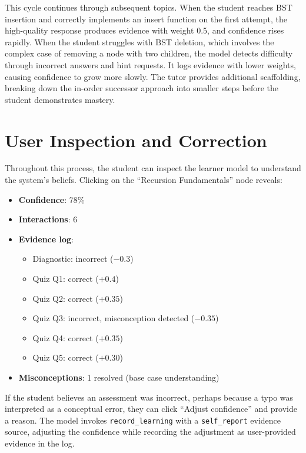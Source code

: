 \documentclass[logo,bsc,singlespacing,parskip,online]{infthesis}
\begin{document}
This cycle continues through subsequent topics. When the student reaches BST insertion and correctly implements an insert function on the first attempt, the high-quality response produces evidence with weight 0.5, and confidence rises rapidly. When the student struggles with BST deletion, which involves the complex case of removing a node with two children, the model detects difficulty through incorrect answers and hint requests. It logs evidence with lower weights, causing confidence to grow more slowly. The tutor provides additional scaffolding, breaking down the in-order successor approach into smaller steps before the student demonstrates mastery.

\section{User Inspection and Correction}

Throughout this process, the student can inspect the learner model to understand the system's beliefs. Clicking on the ``Recursion Fundamentals'' node reveals:

\begin{itemize}
\item \textbf{Confidence}: 78\%
\item \textbf{Interactions}: 6
\item \textbf{Evidence log}:
  \begin{itemize}
  \item Diagnostic: incorrect ($-0.3$)
  \item Quiz Q1: correct ($+0.4$)
  \item Quiz Q2: correct ($+0.35$)
  \item Quiz Q3: incorrect, misconception detected ($-0.35$)
  \item Quiz Q4: correct ($+0.35$)
  \item Quiz Q5: correct ($+0.30$)
  \end{itemize}
\item \textbf{Misconceptions}: 1 resolved (base case understanding)
\end{itemize}

If the student believes an assessment was incorrect, perhaps because a typo was interpreted as a conceptual error, they can click ``Adjust confidence'' and provide a reason. The model invokes \texttt{record\_learning} with a \texttt{self\_report} evidence source, adjusting the confidence while recording the adjustment as user-provided evidence in the log.
\end{document}
